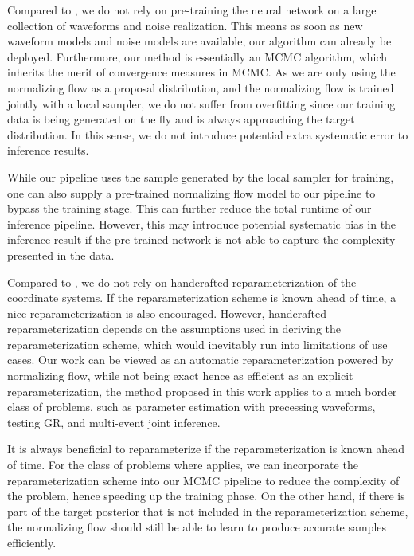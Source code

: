 \documentclass[twocolumn]{aastex631}
\begin{document}
Compared to \cite{Dax:2021tsq,Dax:2022pxd}, we do not rely on pre-training the neural
network on a large collection of waveforms and noise realization. This means as
soon as new waveform models and noise models are available, our algorithm can
already be deployed. Furthermore, our method is essentially an MCMC algorithm,
which inherits the merit of convergence measures in MCMC. As we are only using
the normalizing flow as a proposal distribution, and the normalizing flow is
trained jointly with a local sampler, we do not suffer from overfitting since
our training data is being generated on the fly and is always approaching the
target distribution. In this sense, we do not introduce potential extra
systematic error to inference results.

While our pipeline uses the sample generated by the local sampler for training,
one can also supply a pre-trained normalizing flow model to our pipeline to
bypass the training stage. This can further reduce the total runtime of our
inference pipeline. However, this may introduce potential systematic bias in the
inference result if the pre-trained network is not able to capture the
complexity presented in the data.

Compared to \cite{Islam:2022afg,Roulet:2022kot}, we do not rely on handcrafted
reparameterization of the coordinate systems. If the reparameterization scheme
is known ahead of time, a nice reparameterization is also encouraged. However,
handcrafted reparameterization depends on the assumptions used in deriving the
reparameterization scheme, which would inevitably run into limitations of use
cases. Our work can be viewed as an automatic reparameterization powered by
normalizing flow, while not being exact hence as efficient as an explicit
reparameterization, the method proposed in this work applies to a much border
class of problems, such as parameter estimation with precessing waveforms,
testing GR, and multi-event joint inference.

It is always beneficial to reparameterize if the reparameterization is known
ahead of time. For the class of problems where
\cite{Islam:2022afg,Roulet:2022kot} applies, we can incorporate the
reparameterization scheme into our MCMC pipeline to reduce the complexity of the
problem, hence speeding up the training phase. On the other hand, if there is
part of the target posterior that is not included in the reparameterization
scheme, the normalizing flow should still be able to learn to produce accurate
samples efficiently.
\end{document}
